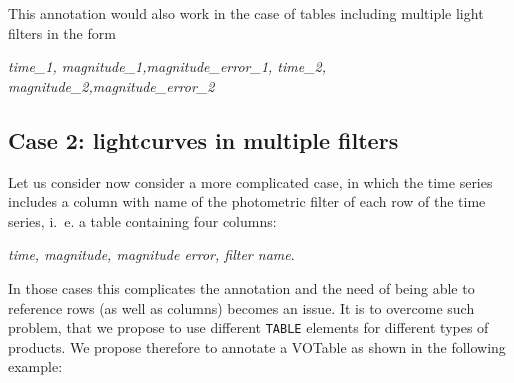 \documentclass[11pt,a4paper]{ivoa}
\let\fg=\color
\def\elem#1{{\tt{\fg{DarkRed}#1}}}
\begin{document}
This annotation would also work in the case of tables including multiple light filters in the form
\begin{center}
   \emph{time\_1, magnitude\_1,magnitude\_error\_1, time\_2, magnitude\_2,magnitude\_error\_2}
\end{center}

\subsection{Case 2: lightcurves in multiple filters}
Let us consider now consider a more complicated case, in which the time series includes a column with name of the photometric filter of each row of the time series, i.~e. a table containing four columns:
\begin{center}
   \emph{time, magnitude, magnitude error, filter name}.
\end{center}
In those cases this complicates the annotation and the need of being able to reference rows (as well as columns) becomes an issue. It is to overcome such problem, that we propose to use different \elem{TABLE} elements for different types of products. We propose therefore to annotate a VOTable as shown in the following example: 

\begingroup

\endgroup    





%


\end{document}
